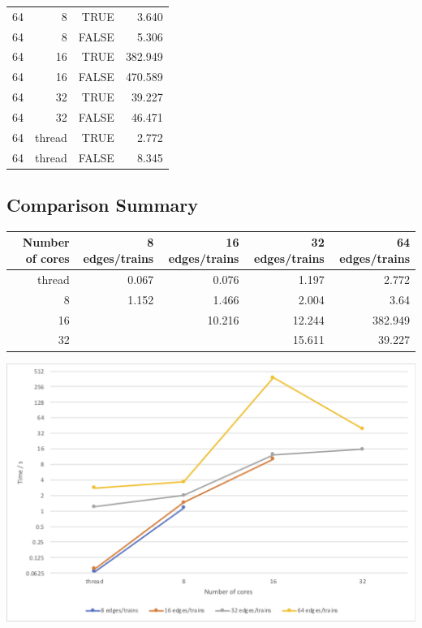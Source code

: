 \documentclass[a4paper,12pt]{article}
\begin{document}
\begin{center}
\begin{tabular}{r r r | r}
		\hline
		64                      & 8          & TRUE  & 3.640   \\
		64                      & 8          & FALSE & 5.306   \\
		64                      & 16         & TRUE  & 382.949 \\
		64                      & 16         & FALSE & 470.589 \\
		64                      & 32         & TRUE  & 39.227  \\
		64                      & 32         & FALSE & 46.471  \\
		64                      & thread     & TRUE  & 2.772   \\
		64                      & thread     & FALSE & 8.345   \\
	\end{tabular}
\end{center}

\subsection{Comparison Summary}
\begin{center}
	\begin{tabular}{r | r r r r}
		\textbf{Number of cores} & 8 edges/trains & 16 edges/trains & 32 edges/trains & 64 edges/trains \\ \hline
		thread                   & 0.067          & 0.076           & 1.197           & 2.772           \\ \hline
		8                        & 1.152          & 1.466           & 2.004           & 3.64            \\
		16                       &                & 10.216          & 12.244          & 382.949         \\
		32                       &                &                 & 15.611          & 39.227          \\
	\end{tabular}
	\label{table:summary}
\end{center}

\begin{center}
	\includegraphics[width=0.8\linewidth]{comparison-chart}
\end{center}
\end{document}
